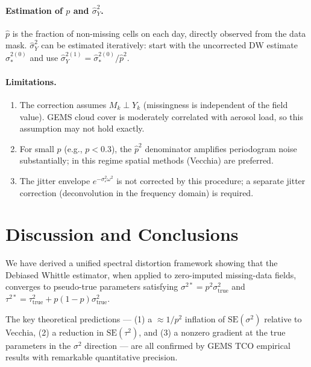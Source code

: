 \documentclass[12pt]{article}
\begin{document}
\paragraph{Estimation of $p$ and $\hat{\sigma}^2_Y$.}
$\hat{p}$ is the fraction of non-missing cells on each day,
directly observed from the data mask.
$\hat{\sigma}^2_Y$ can be estimated iteratively: start with the
uncorrected DW estimate $\hat{\sigma}^{2(0)}_*$ and use
$\hat{\sigma}^{2(1)}_Y = \hat{\sigma}^{2(0)}_* / \hat{p}^2$.

\paragraph{Limitations.}
\begin{enumerate}
  \item The correction assumes $M_k \perp Y_k$ (missingness is
        independent of the field value). GEMS cloud cover is moderately
        correlated with aerosol load, so this assumption may not hold
        exactly.
  \item For small $p$ (e.g., $p < 0.3$), the $\hat{p}^2$ denominator
        amplifies periodogram noise substantially; in this regime
        spatial methods (Vecchia) are preferred.
  \item The jitter envelope $e^{-\sigma^2_\varepsilon\omega^2}$ is not
        corrected by this procedure; a separate jitter correction
        (deconvolution in the frequency domain) is required.
\end{enumerate}


\section{Discussion and Conclusions}

We have derived a unified spectral distortion framework showing that the
Debiased Whittle estimator, when applied to zero-imputed missing-data
fields, converges to pseudo-true parameters satisfying
$\sigma^{2*} = p^2\sigma^2_{\mathrm{true}}$ and
$\tau^{2*} = \tau^2_{\mathrm{true}} + p(1-p)\sigma^2_{\mathrm{true}}$.

The key theoretical predictions — (1) a $\approx 1/p^2$ inflation of
$\mathrm{SE}(\sigma^2)$ relative to Vecchia, (2) a reduction in
$\mathrm{SE}(\tau^2)$, and (3) a nonzero gradient at the true
parameters in the $\sigma^2$ direction — are all confirmed by GEMS TCO
empirical results with remarkable quantitative precision.
\end{document}
